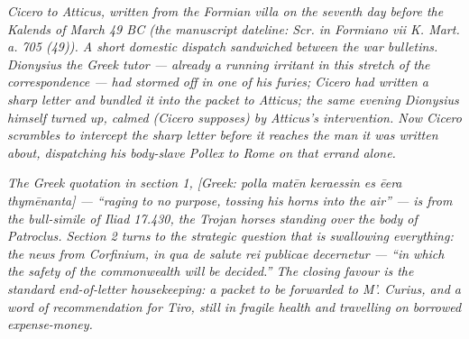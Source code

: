 
\textit{Cicero to Atticus, written from the Formian
villa on the seventh day before the Kalends of March
49 BC (the manuscript dateline: \textit{Scr. in
Formiano vii K. Mart. a. 705 (49)}). A short
domestic dispatch sandwiched between the war
bulletins. Dionysius the Greek tutor --- already a
running irritant in this stretch of the
correspondence --- had stormed off in one of his
furies; Cicero had written a sharp letter and bundled
it into the packet to Atticus; the same evening
Dionysius himself turned up, calmed (Cicero supposes)
by Atticus's intervention. Now Cicero scrambles to
intercept the sharp letter before it reaches the man
it was written about, dispatching his body-slave
Pollex to Rome on that errand alone.}

\textit{The Greek quotation in section 1, \textit{[Greek:
polla matēn keraessin es ēera thymēnanta]} --- ``raging
to no purpose, tossing his horns into the air'' --- is
from the bull-simile of \emph{Iliad} 17.430, the
Trojan horses standing over the body of Patroclus.
Section 2 turns to the strategic question that is
swallowing everything: the news from Corfinium,
\textit{in qua de salute rei publicae decernetur} ---
``in which the safety of the commonwealth will be
decided.'' The closing favour is the standard
end-of-letter housekeeping: a packet to be forwarded
to M'. Curius, and a word of recommendation for
Tiro, still in fragile health and travelling on
borrowed expense-money.}
